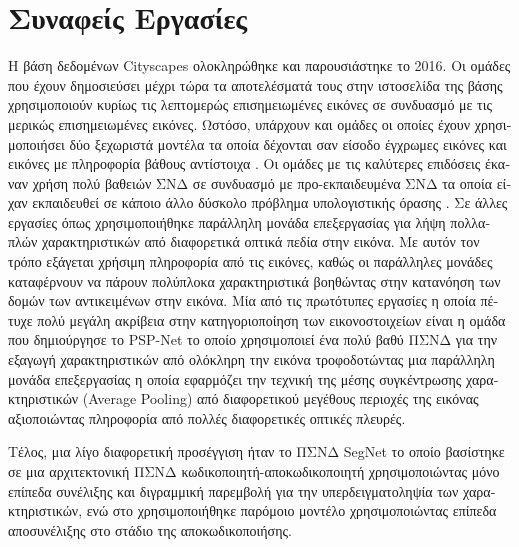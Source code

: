 \section{\textgreek{Συναφείς Εργασίες}}
\textgreek{Η βάση δεδομένων }Cityscapes \textgreek{ολοκληρώθηκε και παρουσιάστηκε το 2016. Οι ομάδες που έχουν δημοσιεύσει μέχρι τώρα τα αποτελέσματά τους στην ιστοσελίδα της βάσης χρησιμοποιούν κυρίως τις λεπτομερώς επισημειωμένες εικόνες σε συνδυασμό με τις μερικώς επισημειωμένες εικόνες. Ωστόσο, υπάρχουν και ομάδες οι οποίες έχουν χρησιμοποιήσει δύο ξεχωριστά μοντέλα τα οποία δέχονται σαν είσοδο έγχρωμες εικόνες και εικόνες με πληροφορία βάθους αντίστοιχα }\cite{adapNet}. \textgreek{Οι ομάδες με τις καλύτερες επιδόσεις έκαναν χρήση πολύ βαθειών ΣΝΔ σε συνδυασμό με προ-εκπαιδευμένα ΣΝΔ τα οποία είχαν εκπαιδευθεί σε κάποιο άλλο δύσκολο πρόβλημα υπολογιστικής όρασης }\cite{RefineNet, video_scene_parsing}. \textgreek{Σε άλλες εργασίες όπως }\cite{duc_hdc,deeplab_1,deeplab_2} \textgreek{χρησιμοποιήθηκε παράλληλη μονάδα επεξεργασίας για λήψη πολλαπλών χαρακτηριστικών από διαφορετικά οπτικά πεδία στην εικόνα. Με αυτόν τον τρόπο εξάγεται χρήσιμη πληροφορία από τις εικόνες, καθώς οι παράλληλες μονάδες καταφέρνουν να πάρουν πολύπλοκα χαρακτηριστικά βοηθώντας στην κατανόηση των δομών των αντικειμένων στην εικόνα. Μία από τις πρωτότυπες εργασίες η οποία πέτυχε πολύ μεγάλη ακρίβεια στην κατηγοριοποίηση των εικονοστοιχείων είναι η ομάδα που δημιούργησε το }PSP-Net \cite{pspnet} \textgreek{το οποίο χρησιμοποιεί ένα πολύ βαθύ ΠΣΝΔ για την εξαγωγή χαρακτηριστικών από ολόκληρη την εικόνα τροφοδοτώντας μια παράλληλη μονάδα επεξεργασίας η οποία εφαρμόζει την τεχνική της μέσης συγκέντρωσης χαρακτηριστικών }(Average Pooling) \textgreek{από διαφορετικού μεγέθους περιοχές της εικόνας αξιοποιώντας πληροφορία από πολλές διαφορετικές οπτικές πλευρές.}

\par \textgreek{Τέλος, μια λίγο διαφορετική προσέγγιση ήταν το ΠΣΝΔ }SegNet \cite{median_freq} \textgreek{το οποίο βασίστηκε σε μια αρχιτεκτονική ΠΣΝΔ κωδικοποιητή-αποκωδικοποιητή χρησιμοποιώντας μόνο επίπεδα συνέλιξης και διγραμμική παρεμβολή για την υπερδειγματοληψία των χαρακτηριστικών, ενώ στο }\cite{deconv_net} \textgreek{χρησιμοποιήθηκε παρόμοιο μοντέλο χρησιμοποιώντας επίπεδα αποσυνέλιξης στο στάδιο της αποκωδικοποιήσης.}
